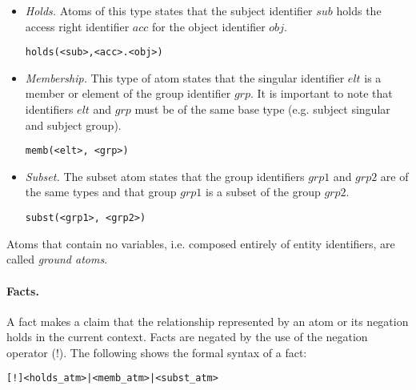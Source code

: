 \documentclass{llncs}
\begin{document}
          \begin{itemize}
            \item
              {\em Holds.} Atoms of this type states that the subject
              identifier $sub$ holds the access right identifier $acc$ for the
              object identifier $obj$.

              \begin{verbatim}holds(<sub>,<acc>.<obj>)\end{verbatim}

            \item
              {\em Membership.} This type of atom states that the singular
              identifier $elt$ is a member or element of the group identifier
              $grp$. It is important to note that identifiers $elt$ and $grp$
              must be of the same base type (e.g. subject singular and subject
              group).

              \begin{verbatim}memb(<elt>, <grp>)\end{verbatim}

            \item
              {\em Subset.} The subset atom states that the group identifiers
              $grp1$ and $grp2$ are of the same types and that group $grp1$ is
              a subset of the group $grp2$.

              \begin{verbatim}subst(<grp1>, <grp2>)\end{verbatim}
          \end{itemize}

          Atoms that contain no variables, i.e. composed entirely of entity
          identifiers, are called {\em ground atoms}.

        \paragraph{Facts.}

          A fact makes a claim that the relationship represented by an atom or
          its negation holds in the current context. Facts are negated by the
          use of the negation operator ($!$). The following shows the formal
          syntax of a fact:

          \begin{verbatim}[!]<holds_atm>|<memb_atm>|<subst_atm>\end{verbatim}
\end{document}
